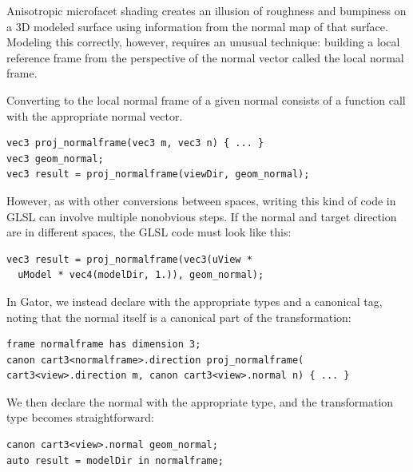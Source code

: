 \documentclass[../main.tex]{subfiles}
\begin{document}
{Anisotropic microfacet shading creates an illusion of roughness and bumpiness on a 3D modeled surface using information from the normal map of that surface.  Modeling this correctly, however, requires an unusual technique: building a local reference frame from the perspective of the normal vector called the local normal frame.

Converting to the local normal frame of a given normal consists of a function call with the appropriate normal vector.
%
\begin{lstlisting}
vec3 proj_normalframe(vec3 m, vec3 n) { ... }
vec3 geom_normal;
vec3 result = proj_normalframe(viewDir, geom_normal);
\end{lstlisting}
%
However, as with other conversions between spaces,
writing this kind of code in GLSL can
involve multiple nonobvious steps.
If the normal and target direction are in different spaces, the GLSL code must look like this:
%
\begin{lstlisting}
vec3 result = proj_normalframe(vec3(uView * 
  uModel * vec4(modelDir, 1.)), geom_normal);
\end{lstlisting}
%
In Gator, we instead declare  with the appropriate types and a canonical tag, noting that the normal itself is a canonical part of the transformation:
%
\begin{lstlisting}
frame normalframe has dimension 3;
canon cart3<normalframe>.direction proj_normalframe(
cart3<view>.direction m, canon cart3<view>.normal n) { ... }
\end{lstlisting}
%
We then declare the normal  with the appropriate type, and the transformation type becomes straightforward:
%
\begin{lstlisting}
canon cart3<view>.normal geom_normal;
auto result = modelDir in normalframe;
\end{lstlisting}
%
}
\end{document}
